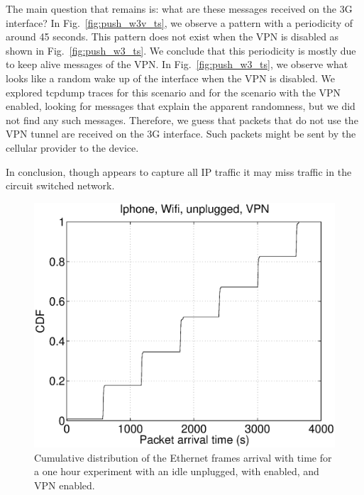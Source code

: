 The main question that remains is: what are these messages received on
the 3G interface? In Fig.~\ref{fig:push_w3v_ts}, we observe a pattern
with a periodicity of around 45 seconds. This pattern does not exist
when the VPN is disabled as shown in Fig.~\ref{fig:push_w3_ts}. We
conclude that this periodicity is mostly due to keep alive messages of the
VPN. In Fig.~\ref{fig:push_w3_ts}, we observe what looks like
a random wake up of the \wifi interface when the VPN is disabled. We
explored tcpdump traces for this scenario and for the scenario with
the VPN enabled, looking for messages that explain the apparent
randomness, but we did not find any such messages. Therefore, we guess
that packets that do not use the VPN tunnel are received on the 3G
interface. Such packets might be sent by the cellular provider to the
device. 

 

In conclusion, though \meddle appears to capture all IP traffic it may
miss traffic in the circuit switched network.

\begin{figure}
\centering
        \includegraphics[width=0.8\linewidth]{../../code/pushNotification/Fig/bw_iphone_wifi_unplug_vpn_ts.eps}
  \caption{Cumulative distribution of the Ethernet frames
          arrival with time for a one hour experiment with an idle
          \iphone{} unplugged, with \wifi{} enabled, and VPN
          enabled.}
  \label{fig:push_wv_ts}
\end{figure}

